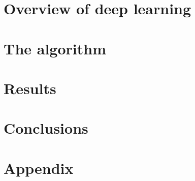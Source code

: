 \documentclass[reqno,review]{siamart}
\begin{document}
\section{Overview of deep learning}
\label{sec-learning--steady-fp}


\section{The algorithm}
\label{sec-algo--steady-fp}

\section{Results}\label{sec-steady-res--steady-fp}



\section{Conclusions}
\label{sec-conclusions--steady-fp}


\section{Appendix}
\label{sec-appendix--steady-fp}





\end{document}
